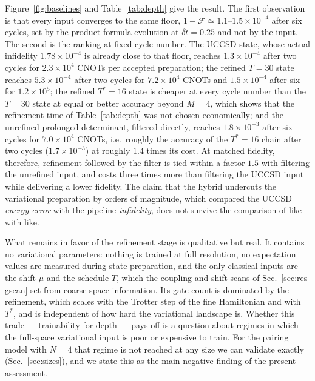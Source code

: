 \documentclass[
  aps,            %
  prc,            %
  reprint,        %
  superscriptaddress,
  floatfix,
  nofootinbib
]{revtex4-2}
\begin{document}
Figure~\ref{fig:baselines} and Table~\ref{tab:depth} give the result.  The
first observation is that every input converges to the same floor,
$1-\mathcal F\simeq1.1$--$1.5\times10^{-4}$ after six cycles, set by the
product-formula evolution at $\delta t=0.25$ and not by the input.  The second
is the ranking at fixed cycle number.  The UCCSD state, whose actual infidelity
$1.78\times10^{-4}$ is already close to that floor, reaches $1.3\times10^{-4}$
after two cycles for $2.3\times10^{4}$ CNOTs per accepted preparation; the
refined $T=30$ state reaches $5.3\times10^{-4}$ after two cycles for
$7.2\times10^{4}$ CNOTs and $1.5\times10^{-4}$ after six for $1.2\times10^{5}$;
the refined $T^{*}=16$ state is cheaper at every cycle number than the $T=30$
state at equal or better accuracy beyond $M=4$, which shows that the
refinement time of Table~\ref{tab:depth} was not chosen economically; and the
unrefined prolonged determinant, filtered directly, reaches $1.8\times10^{-3}$
after six cycles for $7.0\times10^{4}$ CNOTs, i.e.\ roughly the accuracy of the
$T^{*}=16$ chain after two cycles ($1.7\times10^{-3}$) at roughly $1.4$ times its
cost.  At matched fidelity, therefore, refinement followed by the filter is
tied within a factor $1.5$ with filtering the unrefined input, and costs three
times more than filtering the UCCSD input while delivering a lower fidelity.
The claim that the hybrid undercuts the variational preparation by orders of
magnitude, which compared the UCCSD \emph{energy error} with the pipeline
\emph{infidelity}, does not survive the comparison of like with like.

What remains in favor of the refinement stage is qualitative but real.  It
contains no variational parameters: nothing is trained at full resolution, no
expectation values are measured during state preparation, and the only
classical inputs are the shift $\mu$ and the schedule $T$, which the coupling
and shift scans of Sec.~\ref{sec:res-gscan} set from coarse-space information.
Its gate count is dominated by the refinement, which scales with the Trotter
step of the fine Hamiltonian and with $T^{*}$, and is independent of how hard
the variational landscape is.  Whether this trade --- trainability for depth
--- pays off is a question about regimes in which the full-space variational
input is poor or expensive to train.  For the pairing model with $N=4$ that
regime is not reached at any size we can validate exactly
(Sec.~\ref{sec:sizes}), and we state this as the main negative finding of the
present assessment.
\end{document}
